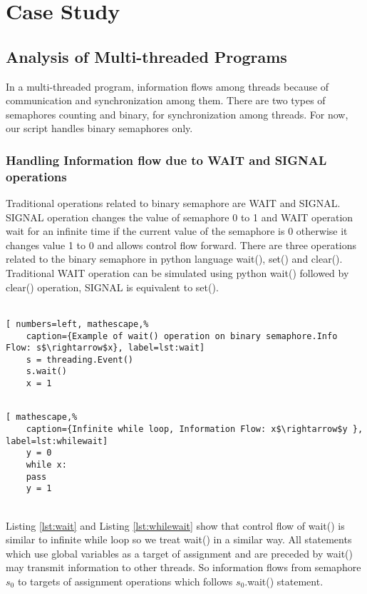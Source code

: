\chapter{Case Study}
\section{Analysis of Multi-threaded Programs}
\label{ch:thread}
In a multi-threaded program, information flows among threads because of communication and synchronization among them. There are two types of semaphores counting and binary, for synchronization among threads. For now, our script handles binary semaphores only. 
\subsection{Handling Information flow due to WAIT and SIGNAL operations}
Traditional operations related to binary semaphore are WAIT and SIGNAL. SIGNAL operation changes the value of semaphore 0 to 1 and WAIT operation wait for an infinite time if the current value of the semaphore is 0 otherwise it changes value 1 to 0 and allows control flow forward. There are three operations related to the binary semaphore in python language wait(), set() and clear(). Traditional WAIT operation can be simulated using python wait() followed by clear() operation, SIGNAL is equivalent to set().\\~\\
\begin{minipage}[b]{0.45\linewidth}
	\centering
	\begin{lstlisting}[ numbers=left, mathescape,%
	caption={Example of wait() operation on binary semaphore.Info Flow: s$\rightarrow$x}, label=lst:wait]
	s = threading.Event()
	s.wait()
	x = 1
	
	\end{lstlisting}
\end{minipage}
\hspace{0.5cm}
\begin{minipage}[b]{0.45\linewidth}
	\centering
	\begin{lstlisting}[ mathescape,%
	caption={Infinite while loop, Information Flow: x$\rightarrow$y }, label=lst:whilewait]
	y = 0
	while x:
	pass
	y = 1
	\end{lstlisting}
\end{minipage}\\
Listing \ref{lst:wait} and Listing \ref{lst:whilewait} show that control flow of wait()  is similar to infinite while loop so we treat wait() in a similar way. All statements which use global variables as a target of assignment and are preceded by wait() may transmit information to other threads. So information flows from semaphore $s_0$ to targets of assignment operations which follows $s_0$.wait() statement.\\
